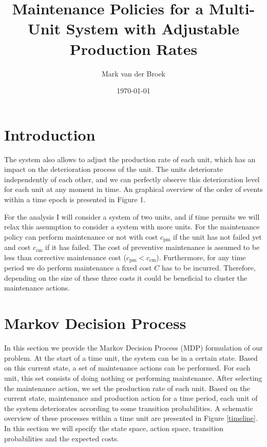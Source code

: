 \documentclass[a4paper,12pt]{article}
\title{Maintenance Policies for a Multi-Unit System with Adjustable Production Rates}
\author{Mark van der Broek}
\date{\today}
\begin{document}
	
	\maketitle

\section{Introduction}	





The system also allows to adjust the production rate of each unit, which has an impact on the deterioration process of the unit. The units deteriorate independently of each other, and we can perfectly observe this deterioration level for each unit at any moment in time. An graphical overview of the order of events within a time epoch is presented in Figure 1.



For the analysis I will consider a system of two units, and if time permits we will relax this assumption to consider a system with more units. For the maintenance policy can perform maintenance or not with cost $c_\text{pm}$ if the unit has not failed yet and cost $c_\text{cm}$ if it has failed. The cost of preventive maintenance is assumed to be less than corrective maintenance cost ($c_\text{pm} < c_\text{cm}$). Furthermore, for any time period we do perform maintenance a fixed cost $C$ has to be incurred. Therefore, depending on the size of these three costs it could be beneficial to cluster the maintenance actions.

\section{Markov Decision Process}
In this section we provide the Markov Decision Process (MDP) formulation of our problem. At the start of a time unit, the system can be in a certain state. Based on this current state, a set of maintenance actions can be performed. For each unit, this set consists of doing nothing or performing maintenance. After selecting the maintenance action, we set the production rate of each unit. Based on the current state, maintenance and production action for a time period, each unit of the system deteriorates according to some transition probabilities. A schematic overview of these processes within a time unit are presented in Figure \ref{timeline}. In this section we will specify the state space, action space, transition probabilities and the expected costs.
\end{document}
